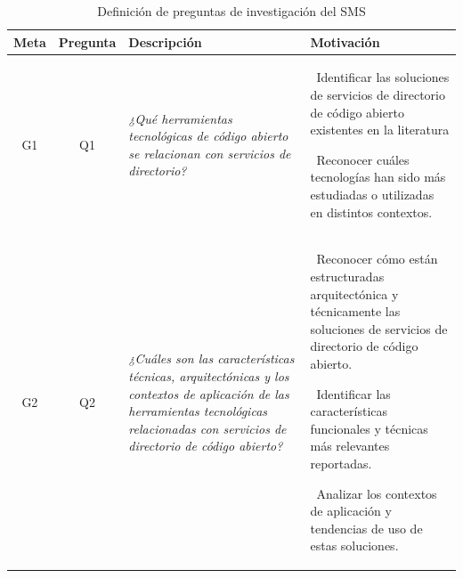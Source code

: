 \begin{table}[H]
	\centering
	\caption{Definición de preguntas de investigación del \acs{SMS}}
	\label{tab:preguntas}

	\renewcommand{\arraystretch}{1.2}
	\fontsize{9pt}{10pt}\selectfont

	\begin{tabularx}{\textwidth}{|c|c|X|X|}
		\hline
		\textbf{Meta}                                                                                                                                                                                 &
		\textbf{Pregunta}                                                                                                                                                                             &
		\textbf{Descripción}                                                                                                                                                                          &
		\textbf{Motivación}
		\\
		\hline
		G1                                                                                                                                                                                            &
		Q1                                                                                                                                                                                            &
		\textit{¿Qué herramientas tecnológicas de código abierto se relacionan con servicios de directorio?}                                                                                          &
		\textbullet\ Identificar las soluciones de servicios de directorio de código abierto existentes en la literatura

		\textbullet\ Reconocer cuáles tecnologías han sido más estudiadas o utilizadas en distintos contextos.
		\\
		\hline
		G2                                                                                                                                                                                            &
		Q2                                                                                                                                                                                            &
		\textit{¿Cuáles son las características técnicas, arquitectónicas y los contextos de aplicación de las herramientas tecnológicas relacionadas con servicios de directorio de código abierto?} &
		\textbullet\ Reconocer cómo están estructuradas arquitectónica y técnicamente las soluciones de servicios de directorio de código abierto.

		\textbullet\ Identificar las características funcionales y técnicas más relevantes reportadas.

		\textbullet\ Analizar los contextos de aplicación y tendencias de uso de estas soluciones.
		\\
		\hline
	\end{tabularx}
\end{table}
